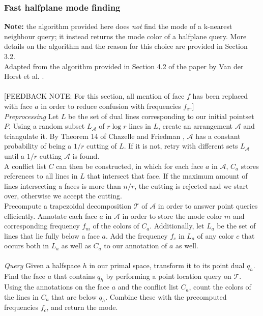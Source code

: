 \documentclass{article}
\newcommand{\fb}[1]{{\color{blue}#1}}
\newcommand{\fbnote}[1]{{\color{blue}[FEEDBACK NOTE: #1]\\}}
\begin{document}
\subsubsection{Fast halfplane mode finding}
\textbf{Note: } the algorithm provided here does \textit{not} find the mode of a k-nearest neighbour query; it instead returns the mode color of a halfplane query. More details on the algorithm and the reason for this choice are provided in Section 3.2. \\
Adapted from the algorithm provided in Section 4.2 of the paper by Van der Horst et al. \cite{vanderhorst_et_al:LIPIcs.ESA.2022.67}. \\\\
\fbnote{For this section, all mention of face $f$ has been replaced with face $a$ in order to reduce confusion with frequencies $f_x$.}
\textit{Preprocessing} Let $L$ be the set of dual lines corresponding to our initial pointset $P$. \fb{Using a random subset $L_{\mathcal{A}}$ of $r \log r$ lines in $L$, create an arrangement $\mathcal{A}$ and triangulate it. By Theorem 14 of Chazelle and Friedman \cite{21970}, $\mathcal{A}$ has a constant probability of being a $1/r$ cutting of $L$. If it is not, retry with different sets $L_{\mathcal{A}}$ until a $1/r$ cutting $\mathcal{A}$ is found.}\\ A conflict list $C$ can then be constructed, in which for each face $a$ in $\mathcal{A}$, $C_a$ stores references to all lines in $L$ that intersect that face. If the maximum amount of lines intersecting a faces is more than $n/r$, the cutting is rejected and we start over, otherwise we accept the cutting. \\
\fb{Precompute a trapezoidal decomposition $\mathcal{T}$ of $\mathcal{A}$ in order to answer point queries efficiently. Annotate each face $a$ in $\mathcal{A}$ in order to store the mode color $m$ and corresponding frequency $f_m$ of the colors of $C_a$. Additionally, let $L_a$ be the set of lines that lie fully below a face $a$. Add the frequency $f_c$ in $L_a$ of any color $c$ that occurs both in $L_a$ as well as $C_a$ to our annotation of $a$ as well.}\\\\
\textit{Query} Given a halfspace $h$ in our primal space, transform it to its point dual $q_h$. Find the face $a$ that contains $q_h$ by performing a point location query on $\mathcal{T}$. Using the annotations on the face $a$ and the conflict list $C_a$, count the colors of the lines in $C_a$ that are below $q_h$. Combine these with the precomputed frequencies $f_c$, and return the mode.
\end{document}
